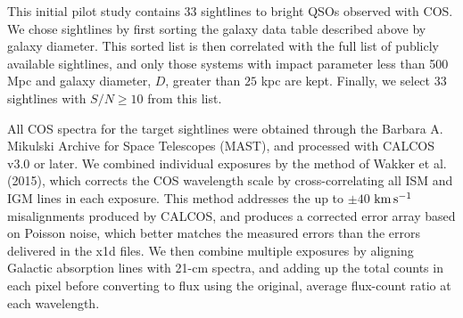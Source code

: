 \documentclass[twocolumn,tighten]{aastex6}
\begin{document}
This initial pilot study contains 33 sightlines to bright QSOs observed with COS. We chose sightlines by first sorting the galaxy data table described above by galaxy diameter. This sorted list is then correlated with the full list of publicly available sightlines, and only those systems with impact parameter less than 500 Mpc and galaxy diameter, $D$, greater than $25$ kpc  are kept. Finally, we select 33 sightlines with $S/N \geq 10$ from this list.

All COS spectra for the target sightlines were obtained through the Barbara A. Mikulski Archive for Space Telescopes (MAST), and processed with CALCOS v3.0 or later. We combined individual exposures by the method of Wakker et al. (2015), which corrects the COS wavelength scale by cross-correlating all ISM and IGM lines in each exposure. This method addresses the up to $\pm40$ $\rm km\, s^{-1}$ misalignments produced by CALCOS, and produces a corrected error array based on Poisson noise, which better matches the measured errors than the errors delivered in the x1d files. We then combine multiple exposures by aligning Galactic absorption lines with 21-cm spectra, and adding up the total counts in each pixel before converting to flux using the original, average flux-count ratio at each wavelength.
\end{document}
